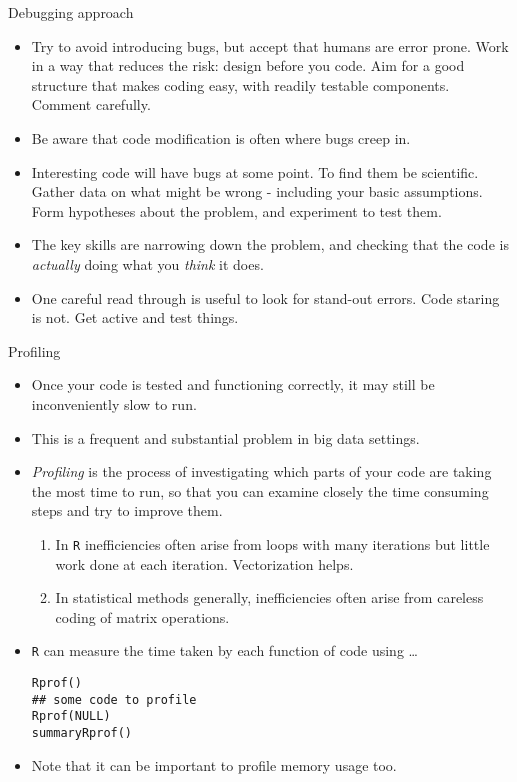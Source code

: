 \documentclass{beamer}
\begin{document}
\begin{frame}[fragile]{Debugging approach}
\begin{itemize}
\item Try to avoid introducing bugs, but accept that humans are error prone. Work in a way that reduces the risk: design before you code. Aim for a good structure that makes coding easy, with readily testable components. Comment carefully.
\item Be aware that code modification is often where bugs creep in.
\item Interesting code will have bugs at some point. To find them be scientific. Gather data on what might be wrong - including your basic assumptions. Form hypotheses about the problem, and experiment to test them.
\item The key skills are narrowing down the problem, and checking that the code is {\em actually} doing what you {\em think} it does.
\item One careful read through is useful to look for stand-out errors. Code staring is not. Get active and test things. 
\end{itemize}
\end{frame}

\begin{frame}[fragile]{Profiling}
\begin{itemize}
\item Once your code is tested and functioning correctly, it may still be inconveniently slow to run.
\item This is a frequent and substantial problem in big data settings. 
\item {\em Profiling} is the process of investigating which parts of your code are taking the most time to run, so that you can examine closely the time consuming steps and try to improve them. 
\begin{enumerate}
\item In {\tt R} inefficiencies often arise from loops with many iterations but little work done at each iteration. Vectorization helps.
\item In statistical methods generally, inefficiencies often arise from careless coding of matrix operations.
\end{enumerate}
\item {\tt R} can measure the time taken by each function of code using \ldots 
{\scriptsize \begin{verbatim}
Rprof()
## some code to profile
Rprof(NULL)
summaryRprof()
\end{verbatim}}
\item Note that it can be important to profile memory usage too.
\end{itemize}
\end{frame}
\end{document}

